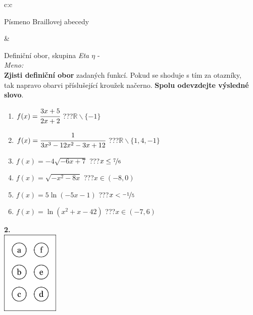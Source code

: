 \documentclass[10pt]{report}
\begin{document}
\begin{tabular}{c:c}
\begin{minipage}[c][99mm][t]{0.49\linewidth}
\begin{center}
\begin{minipage}{0.20\linewidth}
\begin{center}
{\small Písmeno Braillovej abecedy}
\end{center}
\end{minipage}
\end{center}
\end{minipage}
&
\begin{minipage}[c][99mm][t]{0.49\linewidth}
\begin{center}
\vspace{7mm}
{\huge Definiční obor, skupina \textit{Eta $\eta$} -}\\[4.5mm]
\textit{Meno:}\phantom{xxxxxxxxxxxxxxxxxxxxxxxxxxxxxxxxxxxxxxxxxxxxxxxxxxxxxxxxxxxxxxxxx}\\[3.5mm]
\textbf{Zjisti definiční obor} zadaných funkcí. Pokud se shoduje s tím za otazníky,\\tak napravo obarvi příslušející kroužek načerno. \textbf{Spolu odevzdejte výsledné slovo}.\\[3mm]
\begin{minipage}{0.77\linewidth}
\begin{center}
\begin{varwidth}{\textwidth}
\begin{enumerate}
\normalsize
\item $f(x)=\cfrac{3x+5}{2x+2}$\quad \dotfill\; ???\;\dotfill \quad $\mathbb{R}\smallsetminus\{-1\}$
\item $f(x)=\cfrac{1}{3x^3-12x^2-3x+12}$\quad \dotfill\; ???\;\dotfill \quad $\mathbb{R}\smallsetminus\{1,4,-1\}$
\item $f(x)=-4\sqrt{-6x+7}$\quad \dotfill\; ???\;\dotfill \quad $x\leq\nicefrac{7}{6}$
\item $f(x)=\sqrt{-x^2-8x}$\quad \dotfill\; ???\;\dotfill \quad $x\in(-8 , 0)$
\item $f(x)=5\ln{(-5x-1)}$\quad \dotfill\; ???\;\dotfill \quad $x<\nicefrac{-1}{5}$
\item $f(x)=\ln{(x^2+x-42)}$\quad \dotfill\; ???\;\dotfill \quad $x\in(-7 , 6)$
\end{enumerate}
\end{varwidth}
\end{center}
\end{minipage}
\begin{minipage}{0.20\linewidth}
\begin{center}
{\Huge\bfseries 2.} \\[2mm]
\includegraphics[height=40mm]{../images/braille.png}

\end{center}
\end{minipage}
\end{center}
\end{minipage}
\end{tabular}
\end{document}
